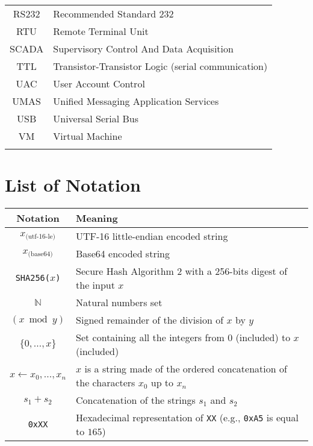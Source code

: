 \begin{notation}
\begin{center}
\begin{tabular}{c@{\hskip 1in}l}
        RS232 & Recommended Standard 232 \\
        RTU & Remote Terminal Unit \\
        SCADA & Supervisory Control And Data Acquisition \\
        TTL & Transistor-Transistor Logic (serial communication) \\
        UAC & User Account Control \\
        UMAS & Unified Messaging Application Services \\
        USB & Universal Serial Bus \\
        VM & Virtual Machine \\
        [1ex] 
        \hline
        \rule{0pt}{10ex}
    \end{tabular}
\end{center}

\cleardoublepage

\section*{List of Notation}
\vspace{0.5cm}
\begin{center}
    \begin{tabular}{c@{\hskip 1in}p{10cm} @{}} 
        \hline
        Notation & Meaning \\
        \hline
        $x_{\textrm{(utf-16-le)}}$ & UTF-16 little-endian encoded string\\
        $x_{\textrm{(base64)}}$ & Base64 encoded string \\ 
        \texttt{SHA256($x$)} & Secure Hash Algorithm 2 with a 256-bits digest of the input $x$ \\
        $\mathbb{N}$ & Natural numbers set \\
        $(x \bmod{y})$ &  Signed remainder of the division of $x$ by $y$ \\
        $\{0, ..., x\}$ &  Set containing all the integers from $0$ (included) to $x$ (included) \\
        $x \gets x_{0},...,x_{n}$ & $x$ is a string made of the ordered concatenation of the characters $x_{0}$ up to $x_{n}$ \\
        $s_1 + s_2$ & Concatenation of the strings $s_1$ and $s_2$\\
        \texttt{0xXX} & Hexadecimal representation of \texttt{XX} (e.g., \texttt{0xA5} is equal to $165$)\\
        [1ex] 
        \hline
    \end{tabular}
\end{center}
\end{notation}